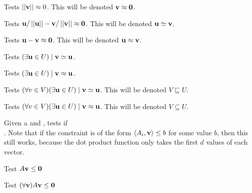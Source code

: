 Tests $\left|\left|\mathbf{v}\right|\right| \approx 0$.  This will be denoted $\mathbf{v} \approx \mathbf{0}$.
\lstapproximatelyzerob

Tests $\mathbf{u}/\left|\left|\mathbf{u}\right|\right| - \mathbf{v}/\left|\left|\mathbf{v}\right|\right| \approx \mathbf{0} $.  This will be denoted $\mathbf{u} \simeq \mathbf{v}$.
\lstisequivalent

Tests $\mathbf{u} - \mathbf{v} \approx \mathbf{0}$.  This will be denoted $\mathbf{u} \approx \mathbf{v}$.
\lstisequal

Tests $(\exists \mathbf{u} \in U) \;|\; \mathbf{v} \simeq \mathbf{u}$.
\lsthasequivalentmember

Tests $(\exists \mathbf{u} \in U) \;|\; \mathbf{v} \approx \mathbf{u}$.
\lsthasequalmember

Tests $(\forall v \in V)(\exists \mathbf{u} \in U) \;|\; \mathbf{v} \simeq \mathbf{u}$.  This will be denoted $V \sqsubseteq U$.
\lstsubsetmodeq

Tests $(\forall v \in V)(\exists \mathbf{u} \in U) \;|\; \mathbf{v} \approx \mathbf{u}$.  This will be denoted $V \subseteq U$.
\lstsubset

Given a  and , tests if \\
.  Note that if the constraint is of the form $\left\langle A_i, \mathbf{v} \right\rangle \leq b$ for some value $b$, then this still works, because the dot product function only takes the first $d$ values of each vector.
\lstraysatisfieda

Test $A\mathbf{v} \leq \mathbf{0}$
\lstraysatisfiedb


Test $(\forall \mathbf{v}) A\mathbf{v} \leq \mathbf{0}$
\lstrayssatisfied

